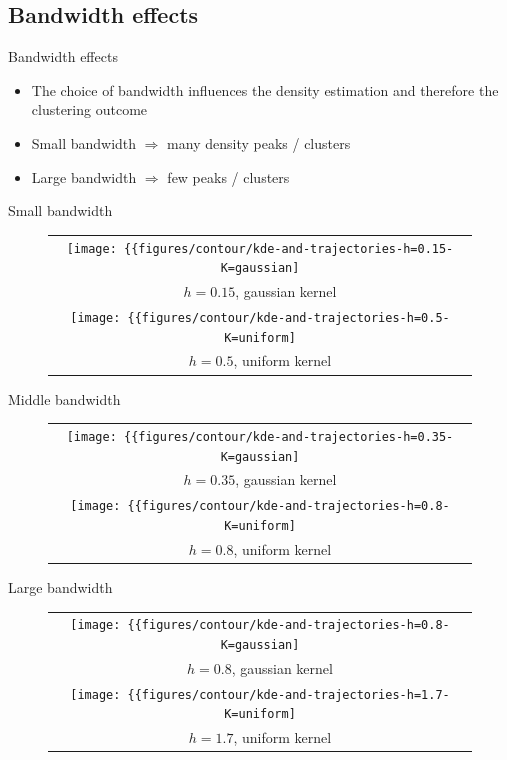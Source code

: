 \documentclass[18pt]{beamer}
\begin{document}
\subsection{Bandwidth effects}

\begin{frame}{Bandwidth effects}
	\begin{itemize}
		\item The choice of bandwidth influences the density estimation and therefore the clustering outcome
	\end{itemize}
	\begin{itemize}
		\item Small bandwidth $\Rightarrow$ many density peaks / clusters
		\item Large bandwidth $\Rightarrow$ few peaks / clusters
	\end{itemize}
\end{frame}
\begin{frame}{Small bandwidth}
\begin{figure}
	\tiny
	\begin{tabular}{c}
		\texttt{[image: \{\{figures/contour/kde-and-trajectories-h=0.15-K=gaussian]}}} \\[-2mm]
		$h=0.15$, gaussian kernel \\
		\texttt{[image: \{\{figures/contour/kde-and-trajectories-h=0.5-K=uniform]}}} \\[-2mm]
		$h=0.5$, uniform kernel
	\end{tabular}
\end{figure}
\end{frame}

\begin{frame}{Middle bandwidth}
\begin{figure}	
	\tiny
	\begin{tabular}{c}
		\texttt{[image: \{\{figures/contour/kde-and-trajectories-h=0.35-K=gaussian]}}} \\[-2mm]
		$h=0.35$, gaussian kernel \\
		\texttt{[image: \{\{figures/contour/kde-and-trajectories-h=0.8-K=uniform]}}} \\[-2mm]
		$h=0.8$, uniform kernel
	\end{tabular}
\end{figure}
\end{frame}

\begin{frame}{Large bandwidth}
\begin{figure}	
	\tiny
	\begin{tabular}{c}
		\texttt{[image: \{\{figures/contour/kde-and-trajectories-h=0.8-K=gaussian]}}} \\[-2mm]
		$h=0.8$, gaussian kernel \\
		\texttt{[image: \{\{figures/contour/kde-and-trajectories-h=1.7-K=uniform]}}} \\[-2mm]
		$h=1.7$, uniform kernel
	\end{tabular}
\end{figure}
\end{frame}
\end{document}
